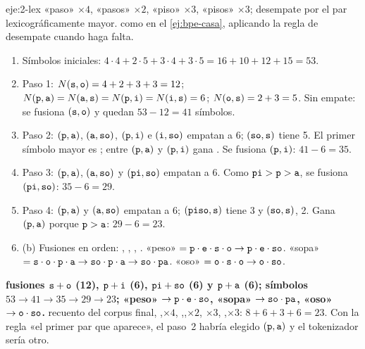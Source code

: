 \begin{solucion}{eje:2-lex}
\datos «paso» $\times4$, «pasos» $\times2$, «piso» $\times3$, «pisos» $\times3$; desempate por el par lexicográficamente mayor.
\planteamiento como en el \cref{ej:bpe-casa}, aplicando la regla de desempate cuando haga falta.
\pasos
\begin{enumerate}[label=\arabic*.]
  \item Símbolos iniciales: $4\cdot 4+2\cdot 5+3\cdot 4+3\cdot 5=16+10+12+15=53$.
  \item Paso 1: $N(\texttt{s},\texttt{o})=4+2+3+3=12$; $N(\texttt{p},\texttt{a})=N(\texttt{a},\texttt{s})=N(\texttt{p},\texttt{i})=N(\texttt{i},\texttt{s})=6$; $N(\texttt{o},\texttt{s})=2+3=5$. Sin empate: se fusiona $(\texttt{s},\texttt{o})$ y quedan $53-12=41$ símbolos.
  \item Paso 2: $(\texttt{p},\texttt{a})$, $(\texttt{a},\texttt{so})$, $(\texttt{p},\texttt{i})$ e $(\texttt{i},\texttt{so})$ empatan a 6; $(\texttt{so},\texttt{s})$ tiene 5. El primer símbolo mayor es ; entre $(\texttt{p},\texttt{a})$ y $(\texttt{p},\texttt{i})$ gana . Se fusiona $(\texttt{p},\texttt{i})$: $41-6=35$.
  \item Paso 3: $(\texttt{p},\texttt{a})$, $(\texttt{a},\texttt{so})$ y $(\texttt{pi},\texttt{so})$ empatan a 6. Como $\texttt{pi}>\texttt{p}>\texttt{a}$, se fusiona $(\texttt{pi},\texttt{so})$: $35-6=29$.
  \item Paso 4: $(\texttt{p},\texttt{a})$ y $(\texttt{a},\texttt{so})$ empatan a 6; $(\texttt{piso},\texttt{s})$ tiene 3 y $(\texttt{so},\texttt{s})$, 2. Gana $(\texttt{p},\texttt{a})$ porque $\texttt{p}>\texttt{a}$: $29-6=23$.
  \item (b) Fusiones en orden: , , , . «peso» $=\texttt{p}\cdot\texttt{e}\cdot\texttt{s}\cdot\texttt{o}\to\texttt{p}\cdot\texttt{e}\cdot\texttt{so}$. «sopa» $=\texttt{s}\cdot\texttt{o}\cdot\texttt{p}\cdot\texttt{a}\to\texttt{so}\cdot\texttt{p}\cdot\texttt{a}\to\texttt{so}\cdot\texttt{pa}$. «oso» $=\texttt{o}\cdot\texttt{s}\cdot\texttt{o}\to\texttt{o}\cdot\texttt{so}$.
\end{enumerate}
\resultado \textbf{fusiones $\texttt{s}+\texttt{o}$ (12), $\texttt{p}+\texttt{i}$ (6), $\texttt{pi}+\texttt{so}$ (6) y $\texttt{p}+\texttt{a}$ (6); símbolos $53\to41\to35\to29\to23$; «peso» $\to\texttt{p}\cdot{}\texttt{e}\cdot{}\texttt{so}$, «sopa» $\to\texttt{so}\cdot{}\texttt{pa}$, «oso» $\to\texttt{o}\cdot{}\texttt{so}$.}
\comprobacion recuento del corpus final, \sep{}$\times4$, \sep{}\sep{}$\times2$, $\times3$, \sep{}$\times3$: $8+6+3+6=23$. Con la regla «el primer par que aparece», el paso~2 habría elegido $(\texttt{p},\texttt{a})$ y el tokenizador sería otro.
\end{solucion}

